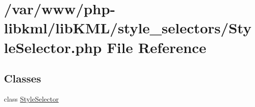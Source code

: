 \hypertarget{StyleSelector_8php}{
\section{/var/www/php-\/libkml/libKML/style\_\-selectors/StyleSelector.php File Reference}
\label{d8/db7/StyleSelector_8php}
}
\subsection*{Classes}
\begin{DoxyCompactItemize}
\item 
class \hyperlink{classStyleSelector}{StyleSelector}
\end{DoxyCompactItemize}
